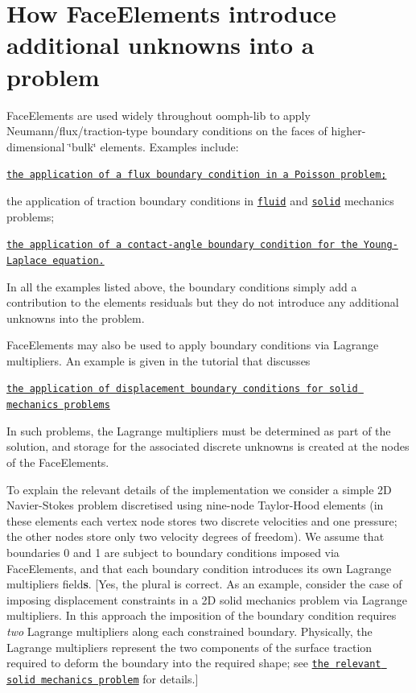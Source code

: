 \hypertarget{index_face}{}\section{How Face\+Elements introduce additional unknowns into a problem}\label{index_face}
{\ttfamily Face\+Elements} are used widely throughout {\ttfamily oomph-\/lib} to apply Neumann/flux/traction-\/type boundary conditions on the faces of higher-\/dimensional \char`\"{}bulk\char`\"{} elements. Examples include\+:
\begin{DoxyItemize}
\item \href{../../../poisson/two_d_poisson_flux_bc2/html/index.html}{\tt the application of a flux boundary condition in a Poisson problem;}
\item the application of traction boundary conditions in \href{../../../navier_stokes/rayleigh_traction_channel/html/index.html}{\tt fluid} and \href{../../../solid/airy_cantilever/html/index.html}{\tt solid} mechanics problems;
\item \href{../../../young_laplace/contact_angle/html/index.html}{\tt the application of a contact-\/angle boundary condition for the Young-\/\+Laplace equation.}
\end{DoxyItemize}In all the examples listed above, the boundary conditions simply add a contribution to the elements\textquotesingle{} residuals but they do not introduce any additional unknowns into the problem.

{\ttfamily Face\+Elements} may also be used to apply boundary conditions via Lagrange multipliers. An example is given in the tutorial that discusses
\begin{DoxyItemize}
\item \href{../../../solid/prescribed_displ_lagr_mult/html/index.html}{\tt the application of displacement boundary conditions for solid mechanics problems}
\end{DoxyItemize}In such problems, the Lagrange multipliers must be determined as part of the solution, and storage for the associated discrete unknowns is created at the nodes of the {\ttfamily Face\+Elements}.

To explain the relevant details of the implementation we consider a simple 2D Navier-\/\+Stokes problem discretised using nine-\/node Taylor-\/\+Hood elements (in these elements each vertex node stores two discrete velocities and one pressure; the other nodes store only two velocity degrees of freedom). We assume that boundaries 0 and 1 are subject to boundary conditions imposed via {\ttfamily Face\+Elements}, and that each boundary condition introduces its own Lagrange multipliers field{\bfseries s}. \mbox{[}Yes, the plural is correct. As an example, consider the case of imposing displacement constraints in a 2D solid mechanics problem via Lagrange multipliers. In this approach the imposition of the boundary condition requires {\itshape two} Lagrange multipliers along each constrained boundary. Physically, the Lagrange multipliers represent the two components of the surface traction required to deform the boundary into the required shape; see \href{../../../solid/prescribed_displ_lagr_mult/html/index.html}{\tt the relevant solid mechanics problem} for details.\mbox{]}

